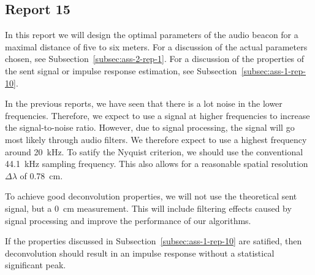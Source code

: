 \documentclass[11pt,titlepage]{report}
\begin{document}
\subsection{Report 15}
In this report we will design the optimal parameters of the audio beacon for a maximal distance of five to six meters. For a discussion of the actual parameters chosen, see Subsection~\ref{subsec:ass-2-rep-1}. For a discussion of the properties of the sent signal or impulse response estimation, see Subsection~\ref{subsec:ass-1-rep-10}.

In the previous reports, we have seen that there is a lot noise in the lower frequencies. Therefore, we expect to use a signal at higher frequencies to increase the signal-to-noise ratio. However, due to signal processing, the signal will go most likely through audio filters. We therefore expect to use a highest frequency around \SI{20}{kHz}. To satify the Nyquist criterion, we should use the conventional \SI{44.1}{kHz} sampling frequency. This also allows for a reasonable spatial resolution $\Delta \lambda$ of \SI{0.78}{cm}.

To achieve good deconvolution properties, we will not use the theoretical sent signal, but a \SI{0}{cm} measurement. This will include filtering effects caused by signal processing and improve the performance of our algorithms.

If the properties discussed in Subsection~\ref{subsec:ass-1-rep-10} are satified, then deconvolution should result in an impulse response without a statistical significant peak.
\end{document}
